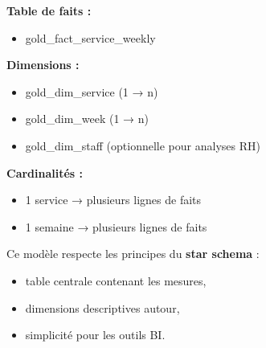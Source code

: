 \documentclass[11pt,a4paper]{article}
\begin{document}
\begin{tcolorbox}[title=\textbf{Schéma en étoile proposé :}, colback=gray!5, colframe=black, boxrule=0.8pt, arc=2mm]

\textbf{Table de faits :}
\begin{itemize}
\item gold\_fact\_service\_weekly
\end{itemize}

\textbf{Dimensions :}
\begin{itemize}
\item gold\_dim\_service (1 → n)
\item gold\_dim\_week (1 → n)
\item gold\_dim\_staff (optionnelle pour analyses RH)
\end{itemize}

\textbf{Cardinalités :}
\begin{itemize}
\item 1 service → plusieurs lignes de faits
\item 1 semaine → plusieurs lignes de faits
\end{itemize}

Ce modèle respecte les principes du \textbf{star schema} :
\begin{itemize}
\item table centrale contenant les mesures,
\item dimensions descriptives autour,
\item simplicité pour les outils BI.
\end{itemize}

\end{tcolorbox}
\end{document}
